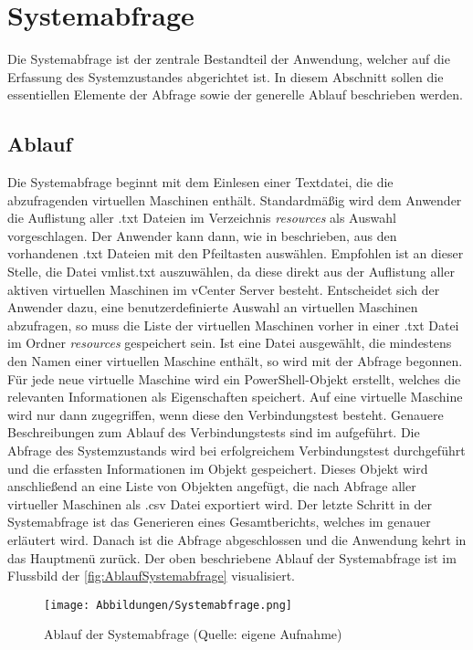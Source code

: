 \section{Systemabfrage}
Die Systemabfrage ist der zentrale Bestandteil der Anwendung, welcher auf die Erfassung des Systemzustandes abgerichtet ist. In diesem Abschnitt sollen die essentiellen Elemente der Abfrage sowie der generelle Ablauf beschrieben werden.
\subsection{Ablauf}
Die Systemabfrage beginnt mit dem Einlesen einer Textdatei, die die abzufragenden virtuellen Maschinen enthält. Standardmäßig wird dem Anwender die Auflistung aller .txt Dateien im Verzeichnis \textit{resources} als Auswahl vorgeschlagen. Der Anwender kann dann, wie in  beschrieben, aus den vorhandenen .txt Dateien mit den Pfeiltasten auswählen. Empfohlen ist an dieser Stelle, die Datei vmlist.txt auszuwählen, da diese direkt aus der Auflistung aller aktiven virtuellen Maschinen im vCenter Server besteht. Entscheidet sich der Anwender dazu, eine benutzerdefinierte Auswahl an virtuellen Maschinen abzufragen, so muss die Liste der virtuellen Maschinen vorher in einer .txt Datei im Ordner \textit{resources} gespeichert sein. Ist eine Datei ausgewählt, die mindestens den Namen einer virtuellen Maschine enthält, so wird mit der Abfrage begonnen. Für jede neue virtuelle Maschine wird ein PowerShell-Objekt erstellt, welches die relevanten Informationen als Eigenschaften speichert. Auf eine virtuelle Maschine wird nur dann zugegriffen, wenn diese den Verbindungstest besteht. Genauere Beschreibungen zum Ablauf des Verbindungstests sind im  aufgeführt. Die Abfrage des Systemzustands wird bei erfolgreichem Verbindungstest durchgeführt und die erfassten Informationen im Objekt gespeichert. Dieses Objekt wird anschließend an eine Liste von Objekten angefügt, die nach Abfrage aller virtueller Maschinen als .csv Datei exportiert wird. Der letzte Schritt in der Systemabfrage ist das Generieren eines Gesamtberichts, welches im  genauer erläutert wird. Danach ist die Abfrage abgeschlossen und die Anwendung kehrt in das Hauptmenü zurück.\newpage
Der oben beschriebene Ablauf der Systemabfrage ist im Flussbild der \autoref{fig:AblaufSystemabfrage} visualisiert.
\begin{figure}[H]
    \centering
    \texttt{[image: Abbildungen/Systemabfrage.png]}
    \caption[Ablauf der Systemabfrage]{Ablauf der Systemabfrage (Quelle: eigene Aufnahme)} 
    \label{fig:AblaufSystemabfrage}
\end{figure}
